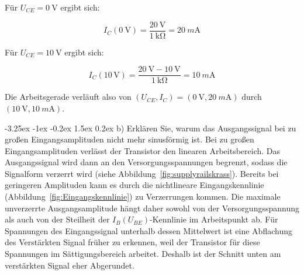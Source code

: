 \documentclass[
	a4paper, %
	12pt, %
]{CSUniSchoolLabReport}
\makeatletter
\renewcommand\paragraph{\@startsection{paragraph}{4}{\z@}%
  {-3.25ex \@plus -1ex \@minus -0.2ex}%
  {1.5ex \@plus 0.2ex}%
  {\normalfont\normalsize\bfseries}}
\newcommand{\milli}{m}
\makeatother
\begin{document}
Für $U_{CE} = \SI{0}{\volt}$ ergibt sich:

\[
I_C(\SI{0}{\volt}) = \frac{\SI{20}{\volt}}{\SI{1}{\kilo\ohm}} = \SI{20}{\milli\ampere}
\]

Für $U_{CE} = \SI{10}{\volt}$ ergibt sich:

\[
I_C(10\,\mathrm{V}) = \frac{\SI{20}{\volt}- \SI{10}{\volt}}{\SI{1}{\kilo\ohm}} = \SI{10}{\milli\ampere}
\]

Die Arbeitsgerade verläuft also von $(U_{CE}, I_C) = (\SI{0}{\volt}, \SI{20}{\milli\ampere})$ durch $(\SI{10}{\volt}, \SI{10}{\milli\ampere})$.

\paragraph{b) Erklären Sie, warum das Ausgangssignal bei zu großen Eingangsamplituden nicht mehr sinusförmig ist.}
Bei zu großen Eingangsamplituden verlässt der Transistor den linearen Arbeitsbereich. Das Ausgangssignal wird dann an den Versorgungsspannungen begrenzt, sodass die Signalform verzerrt wird (siehe Abbildung~\ref{fig:supplyrailskrass}). Bereits bei geringeren Amplituden kann es durch die nichtlineare Eingangskennlinie (Abbildung~\ref{fig:Eingangskennlinie}) zu Verzerrungen kommen. Die maximale unverzerrte Ausgangsamplitude hängt daher sowohl von der Versorgungsspannung als auch von der Steilheit der $I_B(U_{BE})$-Kennlinie im Arbeitspunkt ab.  
Für Spannungen des Eingangssignal unterhalb dessen Mittelwert ist eine Abflachung des Verstärkten Signal früher zu erkennen, weil der Transistor für diese Spannungen im Sättigungsbereich arbeitet. Deshalb ist der Schnitt unten am verstärkten Signal eher Abgerundet. 
\end{document}
